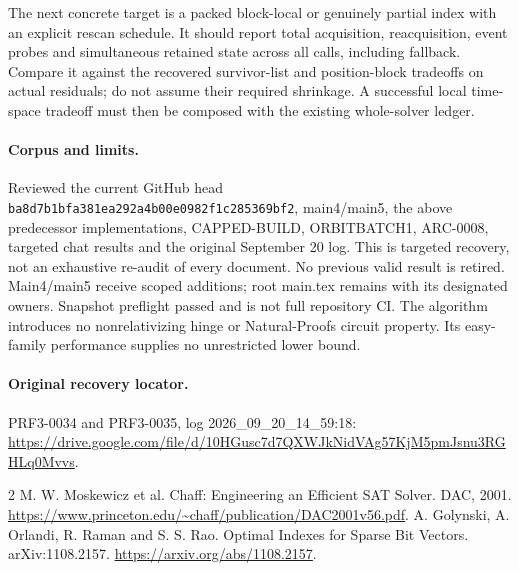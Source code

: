 \documentclass[11pt]{article}
\begin{document}
The next concrete target is a packed block-local or genuinely partial
index with an explicit rescan schedule. It should report total acquisition,
reacquisition, event probes and simultaneous retained state across all
calls, including fallback. Compare it against the recovered survivor-list
and position-block tradeoffs on actual residuals; do not assume their
required shrinkage. A successful local time-space tradeoff must then be
composed with the existing whole-solver ledger.

\paragraph{Corpus and limits.}
Reviewed the current GitHub head
\texttt{ba8d7b1bfa381ea292a4b00e0982f1c285369bf2}, main4/main5,
the above predecessor implementations, CAPPED-BUILD, ORBITBATCH1,
ARC-0008, targeted chat results and the original September 20 log.
This is targeted recovery, not an exhaustive re-audit of every document.
No previous valid result is retired. Main4/main5 receive scoped additions;
root main.tex remains with its designated owners. Snapshot preflight
passed and is not full repository CI. The algorithm introduces no
nonrelativizing hinge or Natural-Proofs circuit property. Its easy-family
performance supplies no unrestricted lower bound.

\paragraph{Original recovery locator.}
PRF3-0034 and PRF3-0035, log 2026\_09\_20\_14\_59:18:
\url{https://drive.google.com/file/d/10HGusc7d7QXWJkNidVAg57KjM5pmJsnu3RGHLq0Mvvs}.

\begin{thebibliography}{2}
 M. W. Moskewicz et al. Chaff: Engineering an Efficient
SAT Solver. DAC, 2001.
\url{https://www.princeton.edu/~chaff/publication/DAC2001v56.pdf}.
 A. Golynski, A. Orlandi, R. Raman and S. S. Rao.
Optimal Indexes for Sparse Bit Vectors. arXiv:1108.2157.
\url{https://arxiv.org/abs/1108.2157}.
\end{thebibliography}
\end{document}

